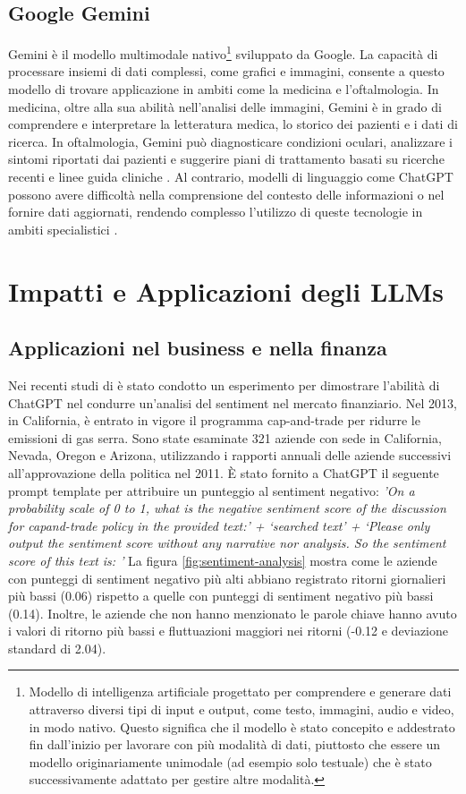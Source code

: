 \subsection{Google Gemini}
Gemini è il modello multimodale nativo\footnote{Modello di intelligenza artificiale progettato per comprendere e generare dati attraverso diversi tipi di input e output, come testo, immagini, audio e video, in modo nativo. Questo significa che il modello è stato concepito e addestrato fin dall'inizio per lavorare con più modalità di dati, piuttosto che essere un modello originariamente unimodale (ad esempio solo testuale) che è stato successivamente adattato per gestire altre modalità.} sviluppato da Google. La capacità di processare insiemi di dati complessi, come grafici e immagini, consente a questo modello di trovare applicazione in ambiti come la medicina e l'oftalmologia. In medicina, oltre alla sua abilità nell'analisi delle immagini, Gemini è in grado di comprendere e interpretare la letteratura medica, lo storico dei pazienti e i dati di ricerca. In oftalmologia, Gemini può diagnosticare condizioni oculari, analizzare i sintomi riportati dai pazienti e suggerire piani di trattamento basati su ricerche recenti e linee guida cliniche \cite{masalkhi2024google}.
Al contrario, modelli di linguaggio come ChatGPT possono avere difficoltà nella comprensione del contesto delle informazioni o nel fornire dati aggiornati, rendendo complesso l'utilizzo di queste tecnologie in ambiti specialistici \cite{waisberg2023bridging} \cite{kocon2023chatgpt} \cite{jeyaraman2023chatgpt} \cite{waisberg2023chatgpt}.

\section{Impatti e Applicazioni degli LLMs}
\subsection{Applicazioni nel business e nella finanza}
Nei recenti studi di \cite{chen2023fiction} è stato condotto un esperimento per dimostrare l'abilità di ChatGPT nel condurre un'analisi del sentiment nel mercato finanziario. Nel 2013, in California, è entrato in vigore il programma cap-and-trade per ridurre le emissioni di gas serra. Sono state esaminate 321 aziende con sede in California, Nevada, Oregon e Arizona, utilizzando i rapporti annuali delle aziende successivi all'approvazione della politica nel 2011. È stato fornito a ChatGPT il seguente prompt template per attribuire un punteggio al sentiment negativo: \textit{'On a probability scale of 0 to 1, what is the negative sentiment score of the discussion for capand-trade policy in the provided text:’ + ‘searched text’ + ‘Please only output the sentiment score without any narrative nor analysis. So the sentiment score of this text is: '}
La figura \ref{fig:sentiment-analysis} mostra come le aziende con punteggi di sentiment negativo più alti abbiano registrato ritorni giornalieri più bassi (0.06) rispetto a quelle con punteggi di sentiment negativo più bassi (0.14). Inoltre, le aziende che non hanno menzionato le parole chiave hanno avuto i valori di ritorno più bassi e fluttuazioni maggiori nei ritorni (-0.12 e deviazione standard di 2.04).

